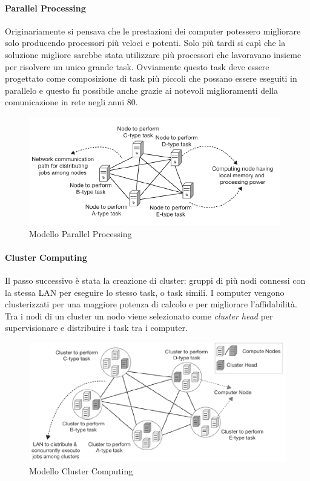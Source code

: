 \documentclass{article}
\begin{document}
\paragraph{Parallel Processing}
Originariamente si pensava che le prestazioni dei computer potessero migliorare solo producendo processori più veloci e potenti. Solo più tardi si capì che la soluzione migliore sarebbe stata utilizzare più processori che lavoravano insieme per risolvere un unico grande task. Ovviamente questo task deve essere progettato come composizione di task più piccoli che possano essere eseguiti in parallelo e questo fu possibile anche grazie ai notevoli miglioramenti della comunicazione in rete negli anni 80.

\begin{figure}[H]
    \centering
    \includegraphics[scale=1]{img/pp.png}
    \caption{Modello Parallel Processing}
\end{figure}

\paragraph{Cluster Computing}
Il passo successivo è stata la creazione di cluster: gruppi di più nodi connessi con la stessa LAN per eseguire lo stesso task, o task simili. I computer vengono clusterizzati per una maggiore potenza di calcolo e per migliorare l’affidabilità. Tra i nodi di un cluster un nodo viene selezionato come \textit{cluster head} per supervisionare e distribuire i task tra i computer.
\begin{figure}[H]
    \centering
    \includegraphics[scale=1]{img/cluster.png}
    \caption{Modello Cluster Computing}
\end{figure}
\end{document}
